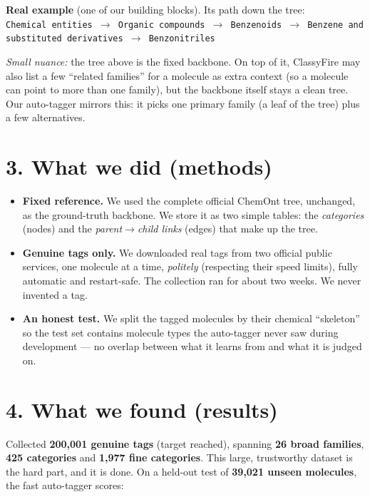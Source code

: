 \documentclass[11pt]{article}
\begin{document}
\begin{tcolorbox}[colback=blue!4,colframe=blue!30,boxrule=0.4pt,left=6pt,right=6pt,top=4pt,bottom=4pt]
{\footnotesize\textbf{Real example} (one of our building blocks). Its path down the tree:}\\[2pt]
{\footnotesize\texttt{Chemical entities $\rightarrow$ Organic compounds $\rightarrow$ Benzenoids
$\rightarrow$ Benzene and substituted derivatives $\rightarrow$ Benzonitriles}}
\end{tcolorbox}
\vspace{2pt}
\emph{Small nuance:} the tree above is the fixed backbone. On top of it, ClassyFire may also list a
few ``related families'' for a molecule as extra context (so a molecule can point to more than one
family), but the backbone itself stays a clean tree. Our auto-tagger mirrors this: it picks one
primary family (a leaf of the tree) plus a few alternatives.

\section*{3. What we did (methods)}
\begin{itemize}
  \item \textbf{Fixed reference.} We used the complete official ChemOnt tree, unchanged, as the
        ground-truth backbone. We store it as two simple tables: the \emph{categories} (nodes) and
        the \emph{parent$\rightarrow$child links} (edges) that make up the tree.
  \item \textbf{Genuine tags only.} We downloaded real tags from two official public services, one
        molecule at a time, \emph{politely} (respecting their speed limits), fully automatic and
        restart-safe. The collection ran for about two weeks. We never invented a tag.
  \item \textbf{An honest test.} We split the tagged molecules by their chemical ``skeleton'' so the
        test set contains molecule types the auto-tagger never saw during development --- no
        overlap between what it learns from and what it is judged on.
\end{itemize}

\section*{4. What we found (results)}
Collected \textbf{200{,}001 genuine tags} (target reached), spanning \textbf{26 broad families},
\textbf{425 categories} and \textbf{1{,}977 fine categories}. This large, trustworthy dataset is
the hard part, and it is done. On a held-out test of \textbf{39{,}021 unseen molecules}, the fast
auto-tagger scores:
\end{document}
